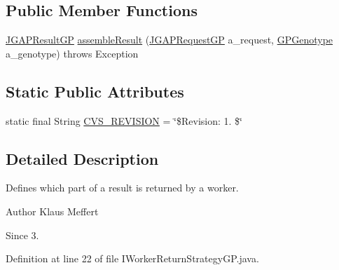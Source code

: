 \subsection*{Public Member Functions}
\begin{DoxyCompactItemize}
\item 
\hyperlink{classorg_1_1jgap_1_1distr_1_1grid_1_1gp_1_1_j_g_a_p_result_g_p}{J\-G\-A\-P\-Result\-G\-P} \hyperlink{interfaceorg_1_1jgap_1_1distr_1_1grid_1_1gp_1_1_i_worker_return_strategy_g_p_a2b7585200984ffa23b7a53e9026d9ae2}{assemble\-Result} (\hyperlink{classorg_1_1jgap_1_1distr_1_1grid_1_1gp_1_1_j_g_a_p_request_g_p}{J\-G\-A\-P\-Request\-G\-P} a\-\_\-request, \hyperlink{classorg_1_1jgap_1_1gp_1_1impl_1_1_g_p_genotype}{G\-P\-Genotype} a\-\_\-genotype)  throws Exception
\end{DoxyCompactItemize}
\subsection*{Static Public Attributes}
\begin{DoxyCompactItemize}
\item 
static final String \hyperlink{interfaceorg_1_1jgap_1_1distr_1_1grid_1_1gp_1_1_i_worker_return_strategy_g_p_a3cb628f3a1e61e39c9c273e14f2a0017}{C\-V\-S\-\_\-\-R\-E\-V\-I\-S\-I\-O\-N} = \char`\"{}\$Revision\-: 1. \$\char`\"{}
\end{DoxyCompactItemize}


\subsection{Detailed Description}
Defines which part of a result is returned by a worker.

\begin{DoxyAuthor}{Author}
Klaus Meffert 
\end{DoxyAuthor}
\begin{DoxySince}{Since}
3. 
\end{DoxySince}


Definition at line 22 of file I\-Worker\-Return\-Strategy\-G\-P.\-java.



